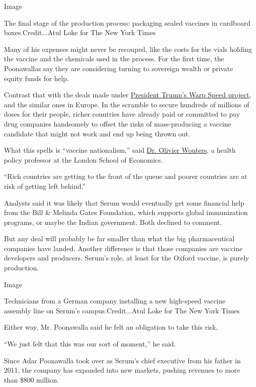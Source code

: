 Image

The final stage of the production process: packaging sealed vaccines in
cardboard boxes.Credit...Atul Loke for The New York Times

Many of his expenses might never be recouped, like the costs for the
vials holding the vaccine and the chemicals used in the process. For the
first time, the Poonawallas say they are considering turning to
sovereign wealth or private equity funds for help.

Contrast that with the deals made under
\href{https://www.nytimes3xbfgragh.onion/2020/06/03/us/politics/coronavirus-vaccine-trump-moderna.html}{President
Trump's Warp Speed project}, and the similar ones in Europe. In the
scramble to secure hundreds of millions of doses for their people,
richer countries have already paid or committed to pay drug companies
handsomely to offset the risks of mass-producing a vaccine candidate
that might not work and end up being thrown out.

What this spells is ``vaccine nationalism,'' said
\href{http://www.lse.ac.uk/health-policy/people/dr-olivier-wouters}{Dr.
Olivier Wouters}, a health policy professor at the London School of
Economics.

``Rich countries are getting to the front of the queue and poorer
countries are at risk of getting left behind.''

Analysts said it was likely that Serum would eventually get some
financial help from the Bill \& Melinda Gates Foundation, which supports
global immunization programs, or maybe the Indian government. Both
declined to comment.

But any deal will probably be far smaller than what the big
pharmaceutical companies have landed. Another difference is that those
companies are vaccine developers and producers. Serum's role, at least
for the Oxford vaccine, is purely production.

Image

Technicians from a German company installing a new high-speed vaccine
assembly line on Serum's campus.Credit...Atul Loke for The New York
Times

Either way, Mr. Poonawalla said he felt an obligation to take this risk.

``We just felt that this was our sort of moment,'' he said.

Since Adar Poonawalla took over as Serum's chief executive from his
father in 2011, the company has expanded into new markets, pushing
revenues to more than \$800 million.

